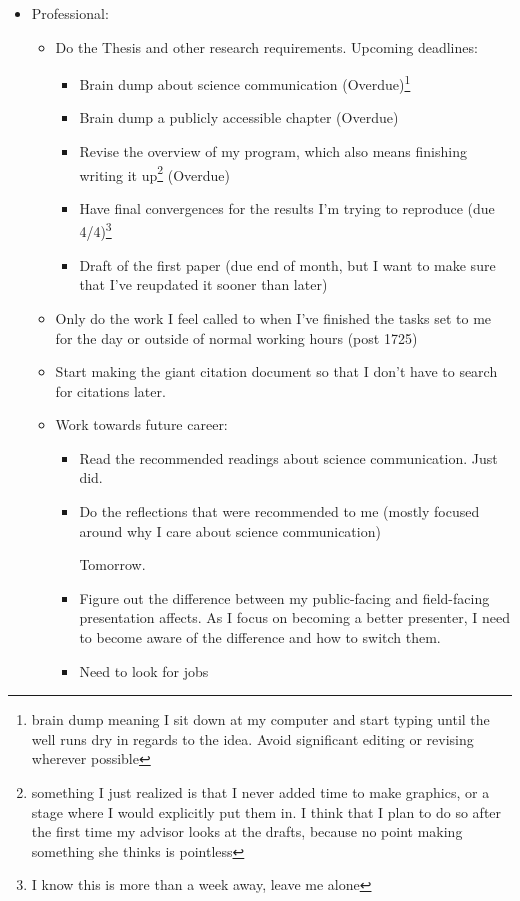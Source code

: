 \documentclass[12pt]{article}[titlepage]
\renewcommand{\,}{\textsuperscript{,}}
\begin{document}
\begin{itemize}
\begin{itemize}
\end{itemize}  
\item Professional:   
\begin{itemize}   
\item Do the Thesis and other research requirements. Upcoming deadlines:  
\begin{itemize}  
\item Brain dump about science communication (Overdue)\footnote{brain dump meaning I sit down at my computer and start typing until the well runs dry in regards to the idea. Avoid significant editing or revising wherever possible}  
\item Brain dump a publicly accessible chapter (Overdue)  
\item Revise the overview of my program, which also means finishing writing it up\footnote{something I just realized is that I never added time to make graphics, or a stage where I would explicitly put them in. I think that I plan to do so after the first time my advisor looks at the drafts, because no point making something she thinks is pointless} (Overdue)  
\item Have final convergences for the results I'm trying to reproduce (due 4/4)\footnote{I know this is more than a week away, leave me alone}  
\item Draft of the first paper (due end of month, but I want to make sure that I've reupdated it sooner than later)  
\end{itemize}  
\item Only do the work I feel called to when I've finished the tasks set to me for the day or outside of normal working hours (post 1725)  
\item Start making the giant citation document so that I don't have to search for citations later.  
\item Work towards future career:   
\begin{itemize}   
\item Read the recommended readings about science communication. Just did.  
\item Do the reflections that were recommended to me (mostly focused around why I care about science communication)

Tomorrow.  
\item Figure out the difference between my public-facing and field-facing presentation affects. As I focus on becoming a better presenter, I need to become aware of the difference and how to switch them.  
\item Need to look for jobs


\end{itemize}
\end{itemize}
\end{itemize}
\end{document}
